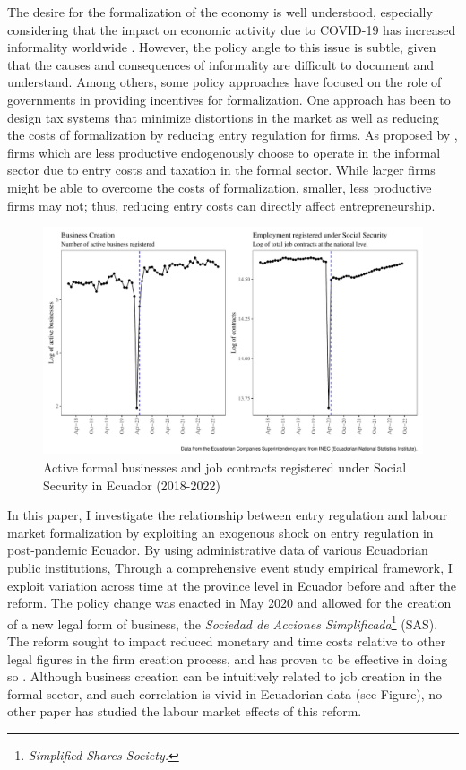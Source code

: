 \documentclass[11pt,a4paper]{article}\usepackage[]{graphicx}\usepackage[]{xcolor}
\makeatletter
\def\maxwidth{ %
  \ifdim\Gin@nat@width>\linewidth
    \linewidth
  \else
    \Gin@nat@width
  \fi
}
\newenvironment{knitrout}{}{} %
\makeatother
\begin{document}
The desire for the formalization of the economy is well understood, especially considering that the impact on economic activity due to COVID-19 has increased informality worldwide \parencite{ILO.2022}. However, the policy angle to this issue is subtle, given that the causes and consequences of informality are difficult to document and understand. Among others, some policy approaches have focused on the role of governments in providing incentives for formalization. One approach has been to design tax systems that minimize distortions in the market \parencite{Bardey.2019} as well as reducing the costs of formalization by reducing entry regulation for firms. As proposed by \textcite{MauricioPrado.2011}, firms which are less productive endogenously choose to operate in the informal sector due to entry costs and taxation in the formal sector. While larger firms might be able to overcome the costs of formalization, smaller, less productive firms may not; thus, reducing entry costs can directly affect entrepreneurship.

\begin{figure}[h]
\caption{Active formal businesses and job contracts registered under Social Security in Ecuador (2018-2022)}
\begin{knitrout}
\color{fgcolor}
\includegraphics[width=\maxwidth]{figure/figure-1-1} 
\end{knitrout}
\end{figure}

In this paper, I investigate the relationship between entry regulation and labour market formalization by exploiting an exogenous shock on entry regulation in post-pandemic Ecuador. By using administrative data of various Ecuadorian public institutions, Through a comprehensive event study empirical framework, I exploit variation across time at the province level in Ecuador before and after the reform. The policy change was enacted in May 2020 and allowed for the creation of a new legal form of business, the \textit{Sociedad de Acciones Simplificada}\footnote{\textit{Simplified Shares Society.}} (SAS). The reform sought to impact reduced monetary and time costs relative to other legal figures in the firm creation process, and has proven to be effective in doing so \textcite{CaminoMogro.2022}. Although business creation can be intuitively related to job creation in the formal sector, and such correlation is vivid in Ecuadorian data (see Figure), no other paper has studied the labour market effects of this reform.
\end{document}
